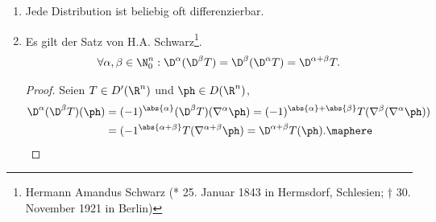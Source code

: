\begin{bem}[Bemerkungen.]
\label{bem:3.14}
\begin{enumerate}[label=\arabic{*}.)]
  \item Jede Distribution ist beliebig oft differenzierbar.
  \item Es gilt der Satz von H.A. Schwarz\footnote{Hermann Amandus Schwarz (*
  25. Januar 1843 in Hermsdorf, Schlesien; † 30. November 1921 in Berlin)}.
\begin{align*}
\forall \alpha,\beta \in \N_0^n : \D^\alpha (\D^\beta T) = \D^\beta(\D^\alpha T)
= \D^{\alpha+\beta}T.
\end{align*}
\begin{proof}
Seien $T\in D'(\R^n)$ und $\ph\in D(\R^n)$,
\begin{align*}
\D^\alpha (\D^\beta T)(\ph) &= (-1)^{\abs{\alpha}}(\D^\beta T)(\nabla^\alpha
\ph) = (-1)^{\abs{\alpha}+\abs{\beta}}T(\nabla^\beta(\nabla^\alpha\ph))\\
&= (-1^{\abs{\alpha+\beta}} T(\nabla^{\alpha+\beta}\ph) =
\D^{\alpha+\beta}T(\ph).\qedhere\maphere
\end{align*}
\end{proof}
\end{enumerate}
\end{bem}

